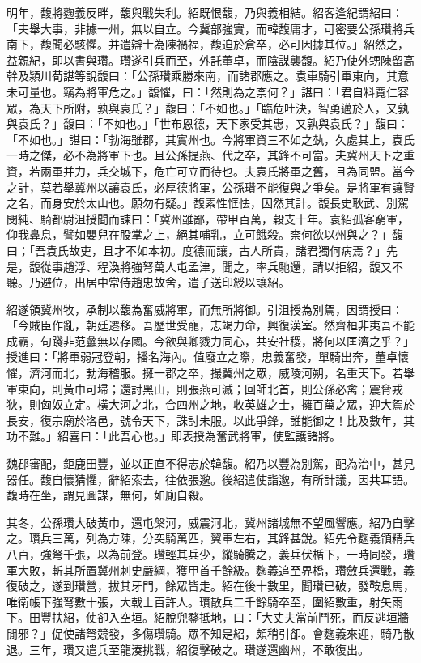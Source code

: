 \begin{pinyinscope}
明年，馥將麴義反畔，馥與戰失利。紹既恨馥，乃與義相結。紹客逢紀謂紹曰：「夫舉大事，非據一州，無以自立。今冀部強實，而韓馥庸才，可密要公孫瓚將兵南下，馥聞必駭懼。并遣辯士為陳禍福，馥迫於倉卒，必可因據其位。」紹然之，益親紀，即以書與瓚。瓚遂引兵而至，外託董卓，而陰謀襲馥。紹乃使外甥陳留高幹及潁川荀諶等說馥曰：「公孫瓚乘勝來南，而諸郡應之。袁車騎引軍東向，其意未可量也。竊為將軍危之。」馥懼，曰：「然則為之柰何？」諶曰：「君自料寬仁容眾，為天下所附，孰與袁氏？」馥曰：「不如也。」「臨危吐決，智勇邁於人，又孰與袁氏？」馥曰：「不如也。」「世布恩德，天下家受其惠，又孰與袁氏？」馥曰：「不如也。」諶曰：「勃海雖郡，其實州也。今將軍資三不如之埶，久處其上，袁氏一時之傑，必不為將軍下也。且公孫提燕、代之卒，其鋒不可當。夫冀州天下之重資，若兩軍并力，兵交城下，危亡可立而待也。夫袁氏將軍之舊，且為同盟。當今之計，莫若舉冀州以讓袁氏，必厚德將軍，公孫瓚不能復與之爭矣。是將軍有讓賢之名，而身安於太山也。願勿有疑。」馥素性恇怯，因然其計。馥長史耿武、別駕閔純、騎都尉沮授聞而諫曰：「冀州雖鄙，帶甲百萬，穀支十年。袁紹孤客窮軍，仰我鼻息，譬如嬰兒在股掌之上，絕其哺乳，立可餓殺。柰何欲以州與之？」馥曰；「吾袁氏故吏，且才不如本初。度德而讓，古人所貴，諸君獨何病焉？」先是，馥從事趙浮、程渙將強弩萬人屯孟津，聞之，率兵馳還，請以拒紹，馥又不聽。乃避位，出居中常侍趙忠故舍，遣子送印綬以讓紹。

紹遂領冀州牧，承制以馥為奮威將軍，而無所將御。引沮授為別駕，因謂授曰：「今賊臣作亂，朝廷遷移。吾歷世受寵，志竭力命，興復漢室。然齊桓非夷吾不能成霸，句踐非范蠡無以存國。今欲與卿戮力同心，共安社稷，將何以匡濟之乎？」授進曰：「將軍弱冠登朝，播名海內。值廢立之際，忠義奮發，單騎出奔，董卓懷懼，濟河而北，勃海稽服。擁一郡之卒，撮冀州之眾，威陵河朔，名重天下。若舉軍東向，則黃巾可埽；還討黑山，則張燕可滅；回師北首，則公孫必禽；震脅戎狄，則匈奴立定。橫大河之北，合四州之地，收英雄之士，擁百萬之眾，迎大駕於長安，復宗廟於洛邑，號令天下，誅討未服。以此爭鋒，誰能御之！比及數年，其功不難。」紹喜曰：「此吾心也。」即表授為奮武將軍，使監護諸將。

魏郡審配，鉅鹿田豐，並以正直不得志於韓馥。紹乃以豐為別駕，配為治中，甚見器任。馥自懷猜懼，辭紹索去，往依張邈。後紹遣使詣邈，有所計議，因共耳語。馥時在坐，謂見圖謀，無何，如廁自殺。

其冬，公孫瓚大破黃巾，還屯槃河，威震河北，冀州諸城無不望風響應。紹乃自擊之。瓚兵三萬，列為方陳，分突騎萬匹，翼軍左右，其鋒甚銳。紹先令麴義領精兵八百，強弩千張，以為前登。瓚輕其兵少，縱騎騰之，義兵伏楯下，一時同發，瓚軍大敗，斬其所置冀州刺史嚴綱，獲甲首千餘級。麴義追至界橋，瓚斂兵還戰，義復破之，遂到瓚營，拔其牙門，餘眾皆走。紹在後十數里，聞瓚已破，發鞍息馬，唯衛帳下強弩數十張，大戟士百許人。瓚散兵二千餘騎卒至，圍紹數重，射矢雨下。田豐扶紹，使卻入空垣。紹脫兜鍪抵地，曰：「大丈夫當前鬥死，而反逃垣牆閒邪？」促使諸弩競發，多傷瓚騎。眾不知是紹，頗稍引卻。會麴義來迎，騎乃散退。三年，瓚又遣兵至龍湊挑戰，紹復擊破之。瓚遂還幽州，不敢復出。


\end{pinyinscope}
